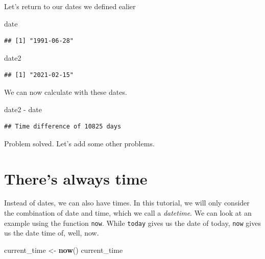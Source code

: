 \documentclass[]{tufte-book}
\newenvironment{Shaded}{}{}
\newcommand{\KeywordTok}[1]{\textcolor[rgb]{0.00,0.44,0.13}{\textbf{#1}}}
\newcommand{\NormalTok}[1]{#1}
\newcommand{\OperatorTok}[1]{\textcolor[rgb]{0.40,0.40,0.40}{#1}}
\newcommand{\StringTok}[1]{\textcolor[rgb]{0.25,0.44,0.63}{#1}}
\begin{document}
Let's return to our dates we defined ealier

\begin{Shaded}
\begin{Highlighting}[]
\NormalTok{date}
\end{Highlighting}
\end{Shaded}

\begin{verbatim}
## [1] "1991-06-28"
\end{verbatim}

\begin{Shaded}
\begin{Highlighting}[]
\NormalTok{date2}
\end{Highlighting}
\end{Shaded}

\begin{verbatim}
## [1] "2021-02-15"
\end{verbatim}

We can now calculate with these dates.

\begin{Shaded}
\begin{Highlighting}[]
\NormalTok{date2 }\OperatorTok{-}\StringTok{ }\NormalTok{date}
\end{Highlighting}
\end{Shaded}

\begin{verbatim}
## Time difference of 10825 days
\end{verbatim}

Problem solved. Let's add some other problems.

\hypertarget{theres-always-time}{%
\section{There's always time}\label{theres-always-time}}

Instead of dates, we can also have times. In this tutorial, we will only consider the combination of date and time, which we call a \emph{datetime}. We can look at an example using the function \texttt{now}. While \texttt{today} gives us the date of today, \texttt{now} gives us the date time of, well, now.

\begin{Shaded}
\begin{Highlighting}[]
\NormalTok{current_time <-}\StringTok{ }\KeywordTok{now}\NormalTok{()}
\NormalTok{current_time}
\end{Highlighting}
\end{Shaded}
\end{document}
